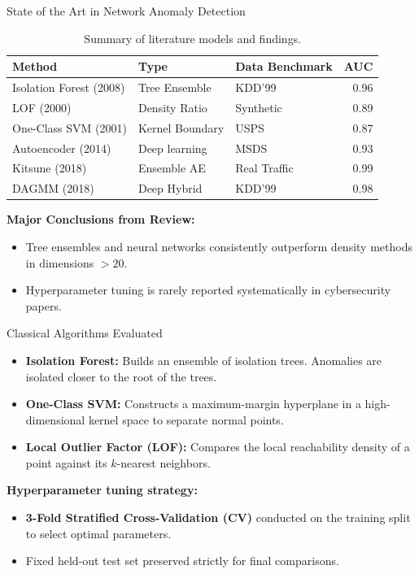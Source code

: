 \documentclass[10pt]{beamer}
\begin{document}
\begin{frame}{State of the Art in Network Anomaly Detection}
  \begin{table}
    \centering
    \caption{Summary of literature models and findings.}
    \label{tab:sota_slides}
    \scriptsize
    \begin{tabular}{lllr}
      \hline
      \textbf{Method} & \textbf{Type} & \textbf{Data Benchmark} & \textbf{AUC} \\ \hline
      Isolation Forest (2008) & Tree Ensemble & KDD'99 & 0.96 \\
      LOF (2000) & Density Ratio & Synthetic & 0.89 \\
      One-Class SVM (2001) & Kernel Boundary & USPS & 0.87 \\
      Autoencoder (2014) & Deep learning & MSDS & 0.93 \\
      Kitsune (2018) & Ensemble AE & Real Traffic & 0.99 \\
      DAGMM (2018) & Deep Hybrid & KDD'99 & 0.98 \\ \hline
    \end{tabular}
  \end{table}
  \textbf{Major Conclusions from Review:}
  \begin{itemize}
    \item Tree ensembles and neural networks consistently outperform density methods in dimensions $>20$.
    \item Hyperparameter tuning is rarely reported systematically in cybersecurity papers.
  \end{itemize}
\end{frame}

\begin{frame}{Classical Algorithms Evaluated}
  \begin{itemize}
    \item \textbf{Isolation Forest:} Builds an ensemble of isolation trees. Anomalies are isolated closer to the root of the trees.
    \item \textbf{One-Class SVM:} Constructs a maximum-margin hyperplane in a high-dimensional kernel space to separate normal points.
    \item \textbf{Local Outlier Factor (LOF):} Compares the local reachability density of a point against its $k$-nearest neighbors.
  \end{itemize}
  \vfill
  \textbf{Hyperparameter tuning strategy:}
  \begin{itemize}
    \item \textbf{3-Fold Stratified Cross-Validation (CV)} conducted on the training split to select optimal parameters.
    \item Fixed held-out test set preserved strictly for final comparisons.
  \end{itemize}
\end{frame}
\end{document}
